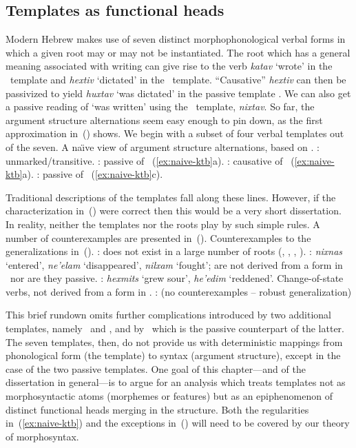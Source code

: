 	\subsection{Templates as functional heads}
Modern Hebrew makes use of seven distinct morphophonological verbal forms in which a given root may or may not be instantiated. The root  which has a general meaning associated with writing can give rise to the verb \emph{katav} `wrote' in the \tkal~template and \emph{hextiv} `dictated' in the \thif~template. ``Causative'' \emph{hextiv} can then be passivized to yield \emph{huxtav} `was dictated' in the passive template \thuf. We can also get a passive reading of `was written' using the \tnif~template, \emph{nixtav}. So far, the argument structure alternations seem easy enough to pin down, as the first approximation in~(\nextx) shows. We begin with a subset of four verbal templates out of the seven.
\pex\label{ex:naive-ktb} A na\"{\i}ve view of argument structure alternations, based on .
  \a \tkal: unmarked/transitive.
  \a \tnif: passive of \tkal~(\ref{ex:naive-ktb}a).
  \a \thif: causative of \tkal~(\ref{ex:naive-ktb}a).
  \a \thuf: passive of \thif~(\ref{ex:naive-ktb}c).
\xe

Traditional descriptions of the templates fall along these lines. However, if the characterization in~(\lastx) were correct then this would be a very short dissertation. In reality, neither the templates nor the roots play by such simple rules. A number of counterexamples are presented in~(\nextx).
\pex Counterexamples to the generalizations in~(\lastx).
  \a \tkal: does not exist in a large number of roots (, , , ).
  \a \tnif: \emph{nixnas} `entered', \emph{ne'elam} `disappeared', \emph{nilxam} `fought'; are not derived from a form in \tkal~nor are they passive.
  \a \thif: \emph{hexmits} `grew sour', \emph{he'edim} `reddened'. Change-of-state verbs, not derived from a form in \tkal.
  \a \thuf: (no counterexamples -- robust generalization)
\xe

This brief rundown omits further complications introduced by two additional templates, namely \thit~and \tpie, and by \tpua~which is the passive counterpart of the latter. The seven templates, then, do not provide us with deterministic mappings from phonological form (the template) to syntax (argument structure), except in the case of the two passive templates. One goal of this chapter---and of the dissertation in general---is to argue for an analysis which treats templates not as morphosyntactic atoms (morphemes or features) but as an epiphenomenon of distinct functional heads merging in the structure. Both the regularities in~(\ref{ex:naive-ktb}) and the exceptions in~(\lastx) will need to be covered by our theory of morphosyntax.

